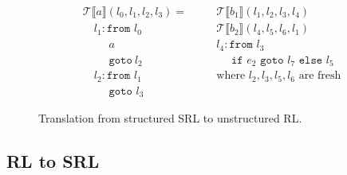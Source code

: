 \begin{figure}
$$\begin{aligned}
    & \mathcal{T}\llbracket a\rrbracket(l_0,l_1,l_2,l_3) =       & & \quad \mathcal{T}\llbracket b_1\rrbracket(l_1,l_2,l_3,l_4)\\
    & \quad l_1: \texttt{from }l_0                               & & \quad \mathcal{T}\llbracket b_2\rrbracket(l_4,l_5,l_6,l_1)\\
    & \quad \ \ \ \ \ \ a                                          & & \quad l_4: \texttt{from }l_3\\
    & \quad \ \ \ \ \ \ \texttt{goto} \ l_2                        & & \quad \ \ \ \ \ \ \texttt{if }e_2\texttt{ goto }l_7\texttt{ else }l_5\\
    & \quad l_2: \texttt{from } l_1                              & & \quad \text{where $l_2,l_3,l_5,l_6$ are fresh}\\
    & \quad \ \ \ \ \ \ \texttt{goto } l_3
  \end{aligned}$$
  \caption{Translation from structured SRL to unstructured RL.}
  \label{fig:translation_srl_to_rl}
\end{figure}




\subsection{RL to SRL}

